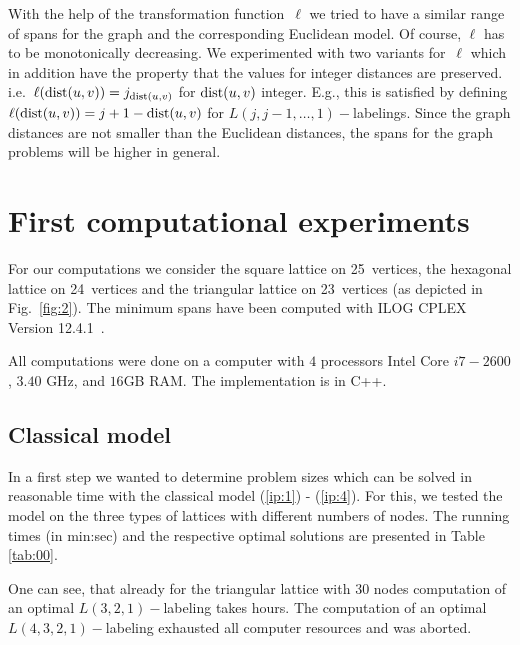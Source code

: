 \documentclass[smallextended]{svjour3}
\def\dist{\mathop{\rm dist}}
\begin{document}
With the help of the transformation function~$\ell$ we tried to have a similar 
range of spans for the graph and the corresponding Euclidean model. 
Of course, $\ell$ has to be monotonically decreasing. We experimented with 
two variants for~$\ell$ which in addition have the property that the values for 
integer distances are preserved. i.e.\ $\ell(\dist(u,v))=j_{\dist(u,v)}$ for $\dist(u,v)$ integer. 
E.g., this is satisfied by defining $\ell(\dist(u,v))=j+1-\dist(u,v)$ for 
$L(j,j-1,\ldots ,1)-$labelings. 
Since the graph distances are not smaller than the Euclidean distances, the 
spans for the graph problems will be higher in general. 

\section{First computational experiments} 

For our computations we consider the square lattice on 25~vertices, the hexagonal 
lattice on 24~vertices and the triangular lattice on 23~vertices (as depicted in Fig.~\ref{fig:2}). 
The minimum spans have been computed with ILOG CPLEX Version 12.4.1~\cite{Cpl15}. 

All computations were done on a computer with $4$ processors Intel Core $i7-2600$, $3.40$ GHz, and $16$GB RAM. The implementation is in C++. 

\subsection{Classical model} 

In a first step we wanted to determine problem sizes which can be solved in reasonable time with the classical model (\ref{ip:1}) - (\ref{ip:4}). 
For this, we tested the model on the three types of lattices with different numbers of nodes. The running times (in min:sec) and the respective optimal solutions are presented in Table \ref{tab:00}. 

One can see, that already for the triangular lattice with $30$ nodes computation of an optimal $L(3,2,1)-$labeling takes hours. The computation of an optimal $L(4,3,2,1)-$labeling exhausted all computer resources and was aborted. 
\end{document}
